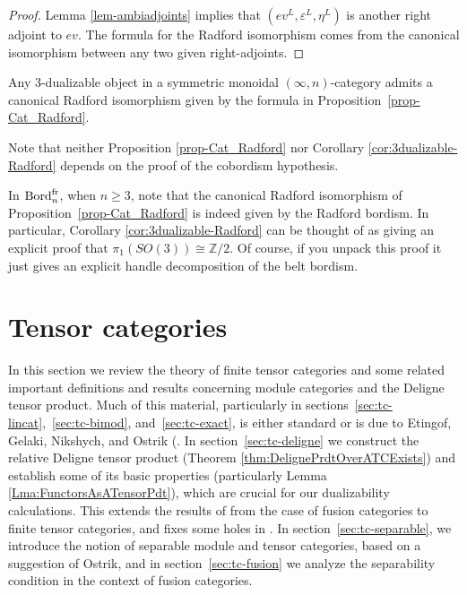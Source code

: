\documentclass{amsart}
\begin{document}
\begin{proof}
	Lemma \ref{lem-ambiadjoints} implies that $(ev^L, \varepsilon^L, \eta^L)$ is another right adjoint to $ev$. The formula for the Radford isomorphism comes from the canonical isomorphism between any two given right-adjoints. 
\end{proof}


\begin{corollary} \label{cor:3dualizable-Radford}
	Any 3-dualizable object in a symmetric monoidal $(\infty,n)$-category admits a canonical Radford isomorphism given by the formula in Proposition~\ref{prop-Cat_Radford}. 
\end{corollary}

Note that neither Proposition \ref{prop-Cat_Radford} nor Corollary \ref{cor:3dualizable-Radford} depends on the proof of the cobordism hypothesis.

\begin{example}
	In $\mathrm{Bord}^\mathrm{fr}_n$, when $n \geq 3$, note that the canonical Radford isomorphism of Proposition~\ref{prop-Cat_Radford} is indeed given by the Radford bordism.  In particular, Corollary \ref{cor:3dualizable-Radford} can be thought of as giving an explicit proof that $\pi_1(SO(3)) \cong \mathbb{Z}/2$.  Of course, if you unpack this proof it just gives an explicit handle decomposition of the belt bordism.
\end{example}

\section{Tensor categories} \label{sec:tc}

In this section we review the theory of finite tensor categories and some related important definitions and results concerning module categories and the Deligne tensor product.  Much of this material, particularly in sections~\ref{sec:tc-lincat},~\ref{sec:tc-bimod}, and~\ref{sec:tc-exact}, is either standard or is due to Etingof, Gelaki, Nikshych, and Ostrik (\cite{MR1976459,MR2183279,MR2097289, 0909.3140, EGNO}.  In section~\ref{sec:tc-deligne} we construct the relative Deligne tensor product (Theorem \ref{thm:DelignePrdtOverATCExists})
and establish some of its basic properties (particularly Lemma \ref{Lma:FunctorsAsATensorPdt}), which are crucial for our dualizability calculations.  This extends the results of \cite{0909.3140} from the case of fusion categories to finite tensor categories, and fixes some holes in \cite{0911.4979}.
In section~\ref{sec:tc-separable}, we introduce the notion of separable module and tensor categories, based on a suggestion of Ostrik, and in section~\ref{sec:tc-fusion} we analyze the separability condition in the context of fusion categories.
\end{document}
